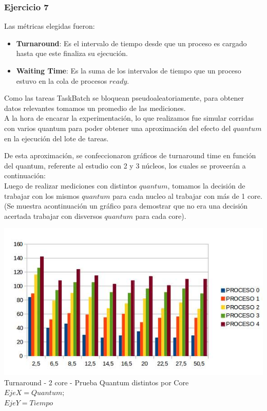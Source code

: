  \subsubsection[Resolución Ejercicio 7]{Ejercicio 7}
 Las métricas elegidas fueron:
\begin{itemize}
 \item \textbf{Turnaround}: Es el intervalo de tiempo desde que un proceso es cargado hasta que este finaliza su ejecución.
 \item \textbf{Waiting Time}: Es la suma de los intervalos de tiempo que un proceso estuvo en la cola de procesos $ready$.
\end{itemize}

\indent \indent Como las tareas TaskBatch se bloquean pseudoaleatoriamente, 
para obtener datos relevantes tomamos un promedio de las mediciones.\\
\indent A la hora de encarar la experimentación, lo que realizamos fue simular corridas con 
varios quantum para poder obtener una aproximación del efecto del $quantum$ en la ejecución del lote de tareas. 

\indent De esta aproximación, se confeccionaron gráficos de turnaround time en función del quantum, 
referente al estudio con 2 y 3 núcleos, los cuales se proveerán a continuación:\\

\indent Luego de realizar mediciones con distintos $quantum$, tomamos la decisión de trabajar con los mismos $quantum$ para cada nucleo
al trabajar con más de 1 core. (Se muestra acontinuación un gráfico para demostrar que no era una decisión acertada trabajar
con disversos $quantum$ para cada core).

\begin{center}
    	\includegraphics[width=1\textwidth]{./EJ7/turnarounddistquan.png}
	{Turnaround - 2 core - Prueba Quantum distintos por Core}\\
	{$Eje X = Quantum; $\\$ Eje Y = Tiempo$}\\
 \end{center}

